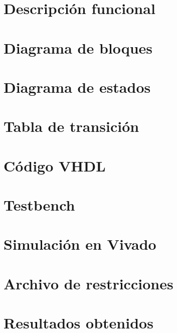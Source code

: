 \documentclass[letterpaper,12pt]{article}
\begin{document}
\section{Descripción funcional}

\section{Diagrama de bloques}


\section{Diagrama de estados}

\section{Tabla de transición}

\section{Código VHDL}

\section{Testbench}


\section{Simulación en Vivado}



\section{Archivo de restricciones}


\section{Resultados obtenidos}
\end{document}
